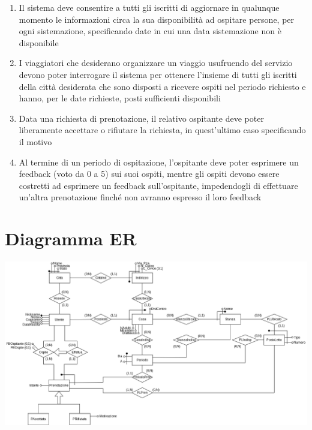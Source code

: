 \documentclass[a4paper,12pt]{report}
\begin{document}
\begin{enumerate}[label*=\arabic*.]
        \begin{enumerate}[label*=\arabic*.]
          \item Il sistema deve consentire a tutti gli iscritti di aggiornare in qualunque momento le informazioni circa la sua disponibilità ad ospitare persone, per ogni sistemazione, specificando date in cui una data sistemazione non è disponibile
          \item I viaggiatori che desiderano organizzare un viaggio usufruendo del servizio devono poter interrogare il sistema per ottenere l’insieme di tutti gli iscritti della città desiderata che sono disposti a ricevere ospiti nel periodo richiesto e hanno, per le date richieste, posti sufficienti disponibili
          \item Data una richiesta di prenotazione, il relativo ospitante deve poter liberamente accettare o rifiutare la richiesta, in quest'ultimo caso specificando il motivo
          \item Al termine di un periodo di ospitazione, l'ospitante deve poter esprimere un feedback (voto da 0 a 5) sui suoi ospiti, mentre gli ospiti devono essere costretti ad esprimere un feedback sull'ospitante, impedendogli di effettuare un'altra prenotazione finché non avranno espresso il loro feedback
        \end{enumerate}
    \end{enumerate}
    \chapter{Diagramma ER}
      \includegraphics[width=1\textwidth]{er.png}
\end{document}
